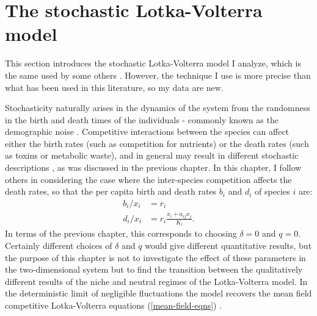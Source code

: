 

\section{The stochastic Lotka-Volterra model}
This section introduces the stochastic Lotka-Volterra model I analyze, which is the same used by some others \cite{Lin2012,Gabel2013,Constable2015}. 
However, the technique I use is more precise than what has been used in this literature, so my data are new. 

Stochasticity naturally arises in the dynamics of the system from the randomness in the birth and death times of the individuals - commonly known as the demographic noise \cite{VanKampen1992,Elgart2004a,Parker2009,Assaf2006}. 
Competitive interactions between the species can affect either the birth rates (such as competition for nutrients) or the death rates (such as toxins or metabolic waste), and in general may result in different stochastic descriptions \cite{Allen2003a,Badali2019b}, as was discussed in the previous chapter. 
In this chapter, I follow others \cite{Lin2012,Gabel2013,Constable2015} in considering the case where the inter-species competition affects the death rates, so that the per capita birth and death rates $b_i$ and $d_i$ of species $i$ are:
\begin{equation}
\begin{aligned}
b_i/x_i &= r_i \\
d_i/x_i &= r_i\frac{x_i+a_{ij}x_j}{K_i}. 
 \label{deathrate}
\end{aligned}
\end{equation}
In terms of the previous chapter, this corresponds to choosing $\delta = 0$ and $q=0$. 
Certainly different choices of $\delta$ and $q$ would give different quantitative results, but the purpose of this chapter is not to investigate the effect of these parameters in the two-dimensional system but to find the transition between the qualitatively different results of the niche and neutral regimes of the Lotka-Volterra model. 
In the deterministic limit of negligible fluctuations the model recovers the mean field competitive Lotka-Volterra equations (\ref{mean-field-eqns}) \cite{Lin2012}. 

